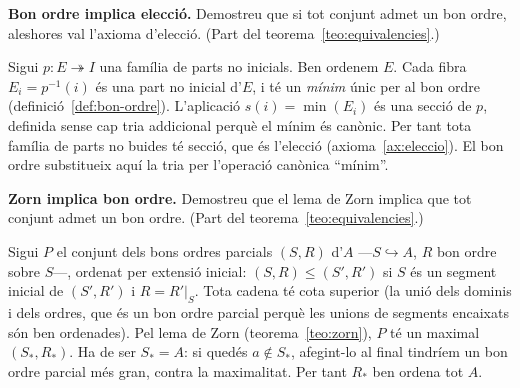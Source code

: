 \begin{exercici}
\textbf{Bon ordre implica elecció.} Demostreu que si tot conjunt admet un bon ordre, aleshores val l'axioma d'elecció. (Part del teorema~\ref{teo:equivalencies}.)
\end{exercici}
\begin{solucio}
Sigui \(p\colon E\twoheadrightarrow I\) una família de parts no inicials. Ben ordenem \(E\). Cada fibra \(E_i=p^{-1}(i)\) és una part no inicial d'\(E\), i té un \emph{mínim} únic per al bon ordre (definició~\ref{def:bon-ordre}). L'aplicació \(s(i)=\min(E_i)\) és una secció de \(p\), definida sense cap tria addicional perquè el mínim és canònic. Per tant tota família de parts no buides té secció, que és l'elecció (axioma~\ref{ax:eleccio}). El bon ordre substitueix aquí la tria per l'operació canònica \enquote{mínim}.
\end{solucio}

\begin{exercici}
\textbf{Zorn implica bon ordre.} Demostreu que el lema de Zorn implica que tot conjunt admet un bon ordre. (Part del teorema~\ref{teo:equivalencies}.)
\end{exercici}
\begin{solucio}
Sigui \(P\) el conjunt dels bons ordres parcials \((S,R)\) d'\(A\) ---\(S\hookrightarrow A\), \(R\) bon ordre sobre \(S\)---, ordenat per extensió inicial: \((S,R)\le(S',R')\) si \(S\) és un segment inicial de \((S',R')\) i \(R=R'|_S\). Tota cadena té cota superior (la unió dels dominis i dels ordres, que és un bon ordre parcial perquè les unions de segments encaixats són ben ordenades). Pel lema de Zorn (teorema~\ref{teo:zorn}), \(P\) té un maximal \((S_*,R_*)\). Ha de ser \(S_*=A\): si quedés \(a\notin S_*\), afegint-lo al final tindríem un bon ordre parcial més gran, contra la maximalitat. Per tant \(R_*\) ben ordena tot \(A\).
\end{solucio}

